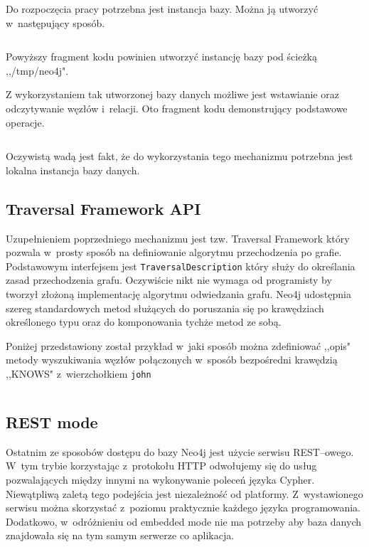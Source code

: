 \documentclass[brudnopis]{xmgr}
\begin{document}
\medskip\noindent Do rozpoczęcia pracy potrzebna jest instancja bazy. Można ją utworzyć w~następujący sposób.

\inputminted{java}{listings/java/neo4j-core-api-dbcreate.java}

Powyższy fragment kodu powinien utworzyć instancję bazy pod ścieżką ,,/tmp/neo4j".

Z wykorzystaniem tak utworzonej bazy danych możliwe jest wstawianie oraz odczytywanie węzłów i~relacji. Oto fragment kodu demonstrujący podstawowe operacje.

\inputminted{java}{listings/java/neo4j-core-api-use.java}

Oczywistą wadą jest fakt, że do wykorzystania tego mechanizmu potrzebna jest lokalna instancja bazy danych.

\subsection{Traversal Framework API}

Uzupełnieniem poprzedniego mechanizmu jest tzw. Traversal Framework który pozwala w~prosty sposób na definiowanie algorytmu przechodzenia po grafie. Podstawowym interfejsem jest \texttt{TraversalDescription} który służy do określania zasad przechodzenia grafu. Oczywiście nikt nie wymaga od programisty by tworzył złożoną implementację algorytmu odwiedzania grafu. Neo4j udostępnia szereg standardowych metod służących do poruszania się po krawędziach określonego typu oraz do komponowania tychże metod ze sobą.

Poniżej przedstawiony został przykład w~jaki sposób można zdefiniować ,,opis" metody wyszukiwania węzłów połączonych w~sposób bezpośredni krawędzią ,,KNOWS" z~wierzchołkiem \texttt{john}

\inputminted{java}{listings/java/neo4j-traversal-api-knows.java}

\subsection{REST mode}

Ostatnim ze sposobów dostępu do bazy Neo4j jest użycie serwisu REST--owego. W~tym trybie korzystając z~protokołu HTTP odwołujemy się do usług pozwalających między innymi na wykonywanie poleceń języka Cypher. Niewątpliwą zaletą tego podejścia jest niezależność od platformy. Z~wystawionego serwisu można skorzystać z~poziomu praktycznie każdego języka programowania. Dodatkowo, w~odróżnieniu od embedded mode nie ma potrzeby aby baza danych znajdowała się na tym samym serwerze co aplikacja.
\end{document}
